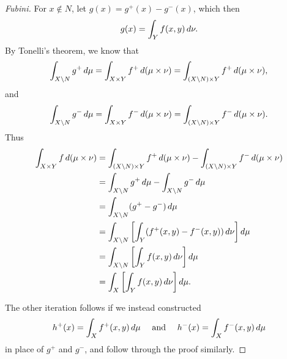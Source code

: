 \documentclass[notoc,notitlepage]{tufte-book}
\begin{document}
\begin{proof}[Fubini]
  For $x \notin N$, let $g(x) = g^+(x) - g^-(x)$,
  which then
  \begin{equation*}
    g(x) = \int_{Y} f(x, y) \mathop{}\!d{\nu}.
  \end{equation*}
  By Tonelli's theorem, we know that
  \begin{equation*}
    \int_{X \setminus N} g^+ \mathop{}\!d{\mu}
    = \int_{X \times Y} f^+ \mathop{}\!d{(\mu \times \nu)}
    = \int_{(X \setminus N) \times Y} f^+ \mathop{}\!d{(\mu \times \nu)},
  \end{equation*}
  and
  \begin{equation*}
    \int_{X \setminus N} g^- \mathop{}\!d{\mu}
    = \int_{X \times Y} f^- \mathop{}\!d{(\mu \times \nu)}
    = \int_{(X \setminus N) \times Y} f^- \mathop{}\!d{(\mu \times \nu)}.
  \end{equation*}
  Thus
  \begin{align*}
    \int_{X \times Y} f \dif{(\mu \times \nu)}
    &= \int_{(X \setminus N) \times Y} f^+ \dif{(\mu \times \nu)}
      - \int_{(X \setminus N) \times Y} f^- \dif{(\mu \times \nu)} \\
    &= \int_{X \setminus N} g^+ \dif{\mu} - \int_{X \setminus N} g^- \dif{\mu} \\
    &= \int_{X \setminus N} (g^+ - g^-) \dif{\mu} \\
    &= \int_{X \setminus N}
      \left[ \int_{Y} ( f^+(x, y) - f^-(x, y) ) \dif{\nu} \right] \dif{\mu} \\
    &= \int_{X \setminus N} \left[ \int_{Y} f(x, y) \dif{\nu} \right] \dif{\mu} \\
    &= \int_{X} \left[ \int_{Y} f(x, y) \dif{\nu} \right] \dif{\mu}.
  \end{align*}

  The other iteration follows if we instead constructed
  \begin{equation*}
    h^+(x) = \int_{X} f^+(x, y) \mathop{}\!d{\mu} \quad\text{ and }\quad
    h^-(x) = \int_{X} f^-(x, y) \mathop{}\!d{\mu}
  \end{equation*}
  in place of $g^+$ and $g^-$, and follow through the proof similarly.
\end{proof}
\end{document}
